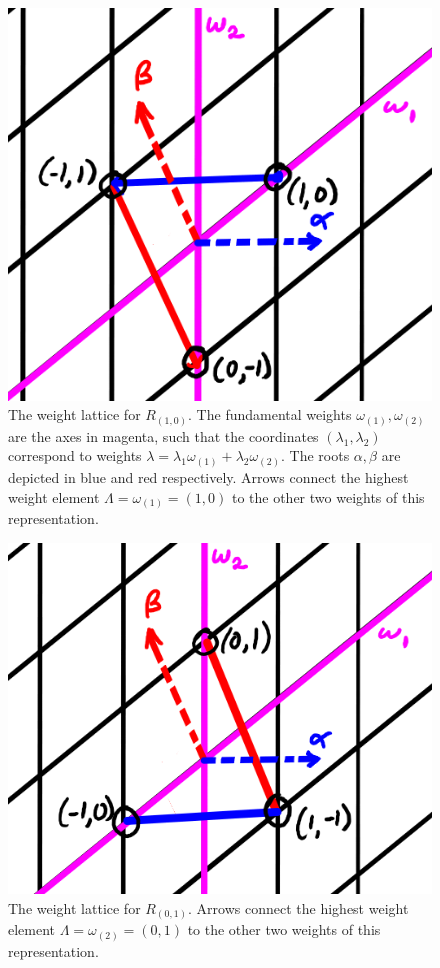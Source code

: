 \begin{figure}
    \centering
    \includegraphics{2018/11/20181122_s1-0.png}
    \caption{The weight lattice for $R_{(1,0)}$. The fundamental weights $\omega_{(1)},\omega_{(2)}$ are the axes in magenta, such that the coordinates $(\lambda_1,\lambda_2)$ correspond to weights $\lambda=\lambda_1\omega_{(1)}+\lambda_2 \omega_{(2)}.$ The roots $\alpha,\beta$ are depicted in blue and red respectively. Arrows connect the highest weight element $\Lambda=\omega_{(1)}=(1,0)$ to the other two weights of this representation.}
    \label{fig:s1-0}
\end{figure}

\begin{figure}
    \centering
    \includegraphics{2018/11/20181122_s0-1.png}
    \caption{The weight lattice for $R_{(0,1)}$. Arrows connect the highest weight element $\Lambda=\omega_{(2)}=(0,1)$ to the other two weights of this representation.}
    \label{fig:s0-1}
\end{figure}

